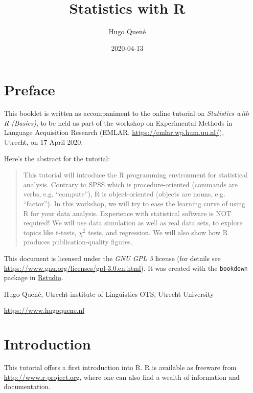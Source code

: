 \documentclass[]{book}
\title{Statistics with R}
\author{Hugo Quené}
\date{2020-04-13}
\begin{document}
\maketitle

{
\setcounter{tocdepth}{1}
\tableofcontents
}
\hypertarget{preface}{%
\chapter*{Preface}\label{preface}}

This booklet is written as accompaniment to the online tutorial on \emph{Statistics with R (Basics)}, to be held as part of the workshop on Experimental Methods in Language Acquisition Research (EMLAR, \url{https://emlar.wp.hum.uu.nl/}), Utrecht, on 17 April 2020.

Here's the abstract for the tutorial:

\begin{quote}
This tutorial will introduce the R programming environment for statistical analysis. Contrary to SPSS which is procedure-oriented (commands are verbs, e.g. ``compute''), R is object-oriented (objects are nouns, e.g. ``factor''). In this workshop, we will try to ease the learning curve of using R for your data analysis. Experience with statistical software is NOT required! We will use data simulation as well as real data sets, to explore topics like t-tests, \(\chi^2\) tests, and regression. We will also show how R produces publication-quality figures.
\end{quote}

This document is licensed under the \emph{GNU GPL 3} license (for details see
\url{https://www.gnu.org/licenses/gpl-3.0.en.html}). It was created with the \texttt{bookdown} package \citep{R-bookdown} in \href{https://www.rstudio.com}{Rstudio}.

Hugo Quené, Utrecht institute of Linguistics OTS, Utrecht University

\url{https://www.hugoquene.nl}

\hypertarget{ch:introduction}{%
\chapter{Introduction}\label{ch:introduction}}

This tutorial offers a first introduction into R.
R is available as freeware from
\url{http://www.r-project.org}, where one can also find a wealth of
information and documentation.
\end{document}
